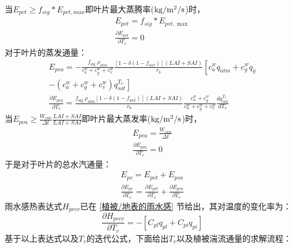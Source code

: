 当$ E_{pvt} \geq f_{sig}\ast E_{pvt,max} $即叶片最大蒸腾率($\rm kg/m^2/s$)时，
\begin{equation}
\begin{array}{c}E_{pvt}=f_{sig} * E_{pvt, \max } \\ \frac{\partial E_{pvt}}{\partial T_{v}}=0\end{array}
\end{equation}
对于叶片的蒸发通量：
\begin{equation}
\begin{array}{c}E_{pva}=-\frac{f_{\text {sig }} \rho_{atm}}{c_{a}^{w}+c_{g}^{w}+c_{v}^{w}} \frac{\left[1-\delta\left(1-f_{w e t}\right)\right](LAI+SAI)}{r_{b}}\left[c_{a}^{w} q_{atm}+c_{g}^{w} q_{g}\right. \\ \left.-\left(c_{a}^{w}+c_{g}^{w}+c_{v}^{w}\right) q_{s a t}^{T_{v}}\right] \\ \frac{\partial E_{pva}}{\partial T_{v}}=\frac{f_{\text {sig }} \rho_{atm}\left[1-\delta\left(1-f_{w e t}\right)\right](LAI+SAI)}{r_{b}} \frac{c_{a}^{w}+c_{g}^{w}}{c_{a}^{w}+c_{g}^{w}+c_{v}^{w}} \frac{d q_{s a t}^{T_{v}}}{d T_{v}}\end{array}
\end{equation}
当$E_{pva} \geq \frac{W_{can}}{\Delta t} \frac{LAI+SAI}{LAI+SAI}$即叶片最大蒸发率($\rm kg/m^2/s$)时，
\begin{equation}
\begin{array}{c}E_{pva}=\frac{W_{can}}{\Delta t} \\ \frac{\partial E_{pva}}{\partial T_{v}}=0\end{array}
\end{equation}
于是对于叶片的总水汽通量：
\begin{equation}
\begin{array}{l}E_{pv}=E_{pvt}+E_{pva} \\ 
    \frac{\partial E_{pv}}{\partial T_{v}}=\frac{\partial E_{pvt}}{\partial T_{v}}+\frac{\partial E_{pva}}{\partial T_{v}}\end{array}
\end{equation}
雨水感热表达式$H_{prcv}$已在 \ref{植被/地表的雨水感} 节给出，其对温度的变化率为：
\begin{equation}
\frac{\partial H_{prcv}}{\partial T_{v}}=-\left[C_{p l} q_{p l}+C_{p i} q_{p i}\right]
\end{equation}
基于以上表达式以及$T_v$的迭代公式，下面给出$T_v$以及植被湍流通量的求解流程：

